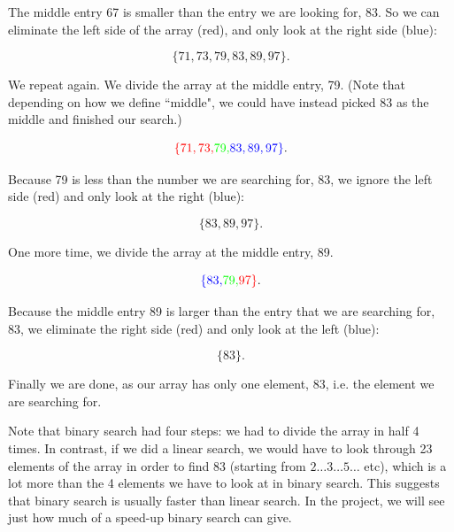 The middle entry 67 is smaller than the entry we are looking for, 83. So we can eliminate the left side of the array (red), and only look at the right side (blue):

\begin{equation*}
    \{71, 73, 79, 83, 89, 97\}.
\end{equation*}

We repeat again. We divide the array at the middle entry, 79. (Note that depending on how we define ``middle", we could have instead picked 83 as the middle and finished our search.)

\begin{equation*}
    \textcolor{red}{\{71, 73, } \textcolor{green}{79,} \textcolor{blue}{83, 89, 97   \}}.
\end{equation*}

Because 79 is less than the number we are searching for, 83, we ignore the left side (red) and only look at the right (blue):

\begin{equation*}
    \{83, 89, 97\}.
\end{equation*}

One more time, we divide the array at the middle entry, 89.

\begin{equation*}
    \textcolor{blue}{\{83, } \textcolor{green}{79,} \textcolor{red}{ 97   \}}.
\end{equation*}

Because the middle entry 89 is larger than the entry that we are searching for, 83, we eliminate the right side (red) and only look at the left (blue):

\begin{equation*}
    \{83\}.
\end{equation*}

Finally we are done, as our array has only one element, 83, i.e. the element we are searching for.

Note that binary search had four steps: we had to divide the array in half 4 times. In contrast, if we did a linear search, we would have to look through 23 elements of the array in order to find 83 (starting from $2\dots 3\dots 5\dots$ etc), which is a lot more than the 4 elements we have to look at in binary search. This suggests that binary search is usually faster than linear search. In the project, we will see just how much of a speed-up binary search can give.

\exercisesection

